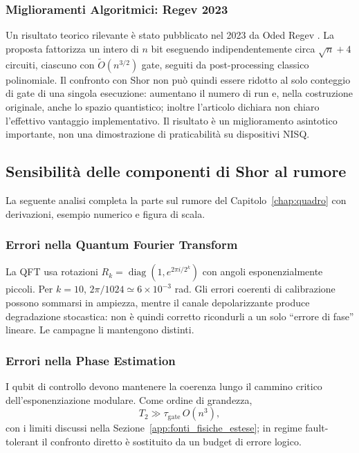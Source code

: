 \subsubsection{Miglioramenti Algoritmici: Regev 2023}

Un risultato teorico rilevante è stato pubblicato nel 2023 da Oded Regev \cite{regev2023}. La proposta fattorizza un intero di $n$ bit eseguendo indipendentemente circa $\sqrt n+4$ circuiti, ciascuno con $\widetilde O(n^{3/2})$ gate, seguiti da post-processing classico polinomiale. Il confronto con Shor non può quindi essere ridotto al solo conteggio di gate di una singola esecuzione: aumentano il numero di run e, nella costruzione originale, anche lo spazio quantistico; inoltre l'articolo dichiara non chiaro l'effettivo vantaggio implementativo. Il risultato è un miglioramento asintotico importante, non una dimostrazione di praticabilità su dispositivi NISQ.

\subsection{Sensibilità delle componenti di Shor al rumore}
\label{app:shor_rumore_esteso}

La seguente analisi completa la parte sul rumore del Capitolo~\ref{chap:quadro}
con derivazioni, esempio numerico e figura di scala.

\subsubsection{Errori nella Quantum Fourier Transform}

La \ac{QFT} usa rotazioni
$R_k=\operatorname{diag}(1,e^{2\pi i/2^k})$ con angoli esponenzialmente
piccoli. Per $k=10$, $2\pi/1024\simeq6\times10^{-3}$ rad. Gli errori coerenti
di calibrazione possono sommarsi in ampiezza, mentre il canale depolarizzante
produce degradazione stocastica: non è quindi corretto ricondurli a un solo
``errore di fase'' lineare. Le campagne li mantengono distinti.

\subsubsection{Errori nella Phase Estimation}

I qubit di controllo devono mantenere la coerenza lungo il cammino critico
dell'esponenziazione modulare. Come ordine di grandezza,
\begin{equation}
    T_2\gg\tau_{\text{gate}}\,O(n^3),
\end{equation}
con i limiti discussi nella Sezione~\ref{app:fonti_fisiche_estese}; in regime
fault-tolerant il confronto diretto è sostituito da un budget di errore logico.

